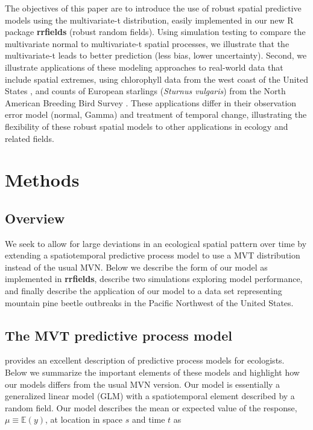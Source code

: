 \documentclass[12pt,english]{article}
\begin{document}
\begin{spacing}{1.25}
The objectives of this paper are to introduce the use of robust spatial
predictive models using the multivariate-t distribution, easily implemented in
our new R package \textbf{rrfields} (robust random fields). Using simulation
testing to compare the multivariate normal to multivariate-t spatial processes,
we illustrate that the multivariate-t leads to better prediction (less bias,
lower uncertainty). Second, we illustrate applications of these modeling
approaches to real-world data that include spatial extremes, using chlorophyll
data from the west coast of the United States \citep{mckibben2012}, and counts
of European starlings (\emph{Sturnus vulgaris}) from the North American
Breeding Bird Survey \citep{pardieck2016}. These applications differ in their
observation error model (normal, Gamma) and treatment of temporal change,
illustrating the flexibility of these robust spatial models to other
applications in ecology and related fields.

\section{Methods}

\subsection{Overview}

We seek to allow for large deviations in an ecological spatial pattern over
time by extending a spatiotemporal predictive process model to use a MVT
distribution instead of the usual MVN. Below we describe the form of our model
as implemented in \textbf{rrfields}, describe two simulations exploring model
performance, and finally describe the application of our model to a data set
representing mountain pine beetle outbreaks in the Pacific Northwest of the
United States. 

\subsection{The MVT predictive process model}

\citet{latimer2009} provides an excellent description of predictive process
models for ecologists. Below we summarize the important elements of these
models and highlight how our models differs from the usual MVN version. Our
model is essentially a generalized linear model (GLM) with a spatiotemporal
element described by a random field. Our model describes the mean or expected
value of the response, $\mu \equiv \mathbb{E}(y)$, at location in space $s$ and
time $t$ as


\end{spacing}
\end{document}
